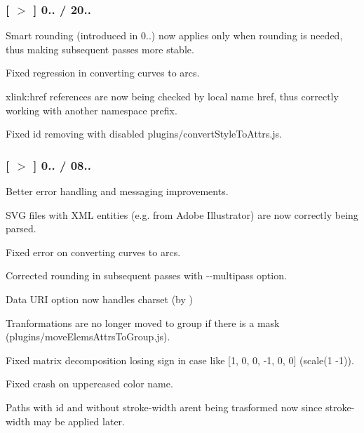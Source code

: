 \subsubsection*{\mbox{[} \href{https://github.com/svg/svgo/tree/v0.6.3}{\tt $>$} \mbox{]} 0.. / 20..}


\begin{DoxyItemize}
\item Smart rounding (introduced in 0..) now applies only when rounding is needed, thus making subsequent passes more stable.
\item Fixed regression in converting curves to arcs.
\item {\ttfamily xlink\+:href} references are now being checked by local name {\ttfamily href}, thus correctly working with another namespace prefix.
\item Fixed {\ttfamily id} removing with disabled {\ttfamily plugins/convert\+Style\+To\+Attrs.\+js}.
\end{DoxyItemize}

\subsubsection*{\mbox{[} \href{https://github.com/svg/svgo/tree/v0.6.2}{\tt $>$} \mbox{]} 0.. / 08..}


\begin{DoxyItemize}
\item Better error handling and messaging improvements.
\item S\+VG files with X\+ML entities (e.\+g. from Adobe Illustrator) are now correctly being parsed.
\item Fixed error on converting curves to arcs.
\item Corrected rounding in subsequent passes with {\ttfamily -\/-\/multipass} option.
\item Data U\+RI option now handles charset (by )
\item Tranformations are no longer moved to group if there is a mask ({\ttfamily plugins/move\+Elems\+Attrs\+To\+Group.\+js}).
\item Fixed matrix decomposition losing sign in case like {\ttfamily \mbox{[}1, 0, 0, -\/1, 0, 0\mbox{]}} ({\ttfamily scale(1 -\/1)}).
\item Fixed crash on uppercased color name.
\item Paths with {\ttfamily id} and without {\ttfamily stroke-\/width} aren\textquotesingle{}t being trasformed now since {\ttfamily stroke-\/width} may be applied later.
\end{DoxyItemize}

